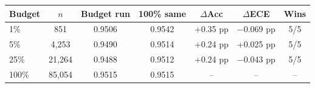 \begin{tabular}{@{}lcccccc@{}}
\toprule
Budget & $n$ & Budget run & 100\% same & $\Delta$Acc & $\Delta$ECE & Wins \\
\midrule
1\% & 851 & 0.9506 & 0.9542 & +0.35 pp & $-$0.069 pp & 5/5 \\
5\% & 4,253 & 0.9490 & 0.9514 & +0.24 pp & +0.025 pp & 5/5 \\
25\% & 21,264 & 0.9488 & 0.9512 & +0.24 pp & $-$0.043 pp & 5/5 \\
100\% & 85,054 & 0.9515 & 0.9515 & -- & -- & -- \\
\bottomrule
\end{tabular}